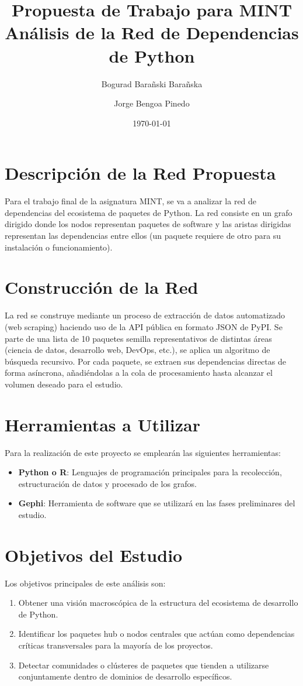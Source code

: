 \documentclass[12pt,a4paper]{article}
\title{\textbf{Propuesta de Trabajo para MINT}\\
	Análisis de la Red de Dependencias de Python}
\author{Bogurad Barañski Barañska \and Jorge Bengoa Pinedo}
\date{\today}
\begin{document}
	
	\maketitle
	
	\section{Descripción de la Red Propuesta}
	Para el trabajo final de la asignatura MINT, se va a analizar la red de dependencias del ecosistema de paquetes de Python. La red consiste en un grafo dirigido donde los nodos representan paquetes de software y las aristas dirigidas representan las dependencias entre ellos (un paquete requiere de otro para su instalación o funcionamiento). 
	
	\section{Construcción de la Red}
	La red se construye mediante un proceso de extracción de datos automatizado (web scraping) haciendo uso de la API pública en formato JSON de PyPI. Se parte de una lista de 10 paquetes semilla representativos de distintas áreas (ciencia de datos, desarrollo web, DevOps, etc.), se aplica un algoritmo de búsqueda recursivo. Por cada paquete, se extraen sus dependencias directas de forma asíncrona, añadiéndolas a la cola de procesamiento hasta alcanzar el volumen deseado para el estudio.
	
	\section{Herramientas a Utilizar}
	Para la realización de este proyecto se emplearán las siguientes herramientas:
	\begin{itemize}
		\item \textbf{Python o R}: Lenguajes de programación principales para la recolección, estructuración de datos y procesado de los grafos.
		\item \textbf{Gephi}: Herramienta de software que se utilizará en las fases preliminares del estudio.
	\end{itemize}
	
	\section{Objetivos del Estudio}
	Los objetivos principales de este análisis son:
	\begin{enumerate}
		\item Obtener una visión macroscópica de la estructura del ecosistema de desarrollo de Python.
		\item Identificar los paquetes hub o nodos centrales que actúan como dependencias críticas transversales para la mayoría de los proyectos.
		\item Detectar comunidades o clústeres de paquetes que tienden a utilizarse conjuntamente dentro de dominios de desarrollo específicos.
	\end{enumerate}
	
\end{document}

